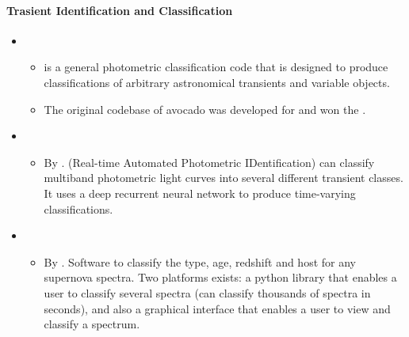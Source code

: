 \documentclass[letterpaper,10pt,english]{sphinxmanual}
\begin{document}
\paragraph{Trasient Identification and Classification}
\label{\detokenize{resource/astro/topics/transient_and_time_domain:trasient-identification-and-classification}}\begin{itemize}
\item {} 
\begin{itemize}
\item {} 
 is a general photometric classification code that is
designed to produce classifications of arbitrary astronomical
transients and variable objects.

\item {} 
The original codebase of avocado was developed for and won the
.

\end{itemize}

\item {} 
\begin{itemize}
\item {} 
By .
 (Real-time Automated Photometric IDentification) can
classify multiband photometric light curves into several different
transient classes. It uses a deep recurrent neural network to
produce time-varying classifications.

\end{itemize}

\item {} 
\begin{itemize}
\item {} 
By .
Software to classify the type, age, redshift and host for any
supernova spectra. Two platforms exists: a python library that
enables a user to classify several spectra (can classify thousands
of spectra in seconds), and also a graphical interface that
enables a user to view and classify a spectrum.


\end{itemize}
\end{itemize}
\end{document}
